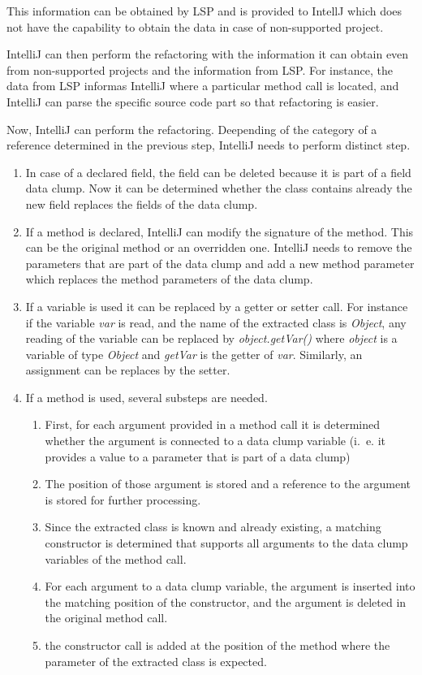 This information can be obtained by \ac{LSP} and is provided to IntellJ which does not have the capability to obtain the data in case of non-supported project.

IntelliJ can then perform the refactoring with the information it can obtain even from non-supported projects and the information from \ac{LSP}. For instance, the data from \ac{LSP} informas IntelliJ where a particular method call is located, and IntelliJ can parse the specific source code part so that refactoring is easier.

Now, IntelliJ can perform the refactoring. Deepending of the category of a reference determined in the previous step, IntelliJ needs to perform distinct step. 
\begin{enumerate}
    \item In case of a declared field, the field can be deleted because it is part of a field data clump. Now it can be determined whether the class contains already the new field replaces the fields of the data clump.
    \item If a method is declared, IntelliJ can modify the signature of the method. This can be the original method or an overridden one. IntelliJ needs to remove the parameters that are part of the data clump and add a new method parameter which replaces the method parameters of the data clump. 
    \item If a variable is used it can be replaced by a getter or setter call. For instance if the variable \textit{var} is read, and the name of the extracted class is \textit{Object}, any reading of the variable can be replaced by  \textit{object.getVar()} where \textit{object} is a variable of type \textit{Object} and \textit{getVar} is the getter of \textit{var}. Similarly, an assignment can be replaces by the setter.
    \item If a method is used, several substeps are needed.
    \begin{enumerate}
        \item First, for each argument provided in a method call it is determined whether the argument is connected to a data clump variable (i.~e. it provides a value to a parameter that is part of a data clump) 
        \item The position of those argument is stored and a reference to the argument is stored for further processing.
        \item Since the extracted class is known and already existing, a matching constructor  is determined that supports all arguments to the data clump variables of the method call. 
        \item For each argument to a data clump variable, the argument is inserted into the matching position of the constructor, and the argument  is deleted in the original method call. 
        \item the constructor call is added at the position of the method  where the parameter of the extracted class is expected. 
        
    \end{enumerate}
    
\end{enumerate}


